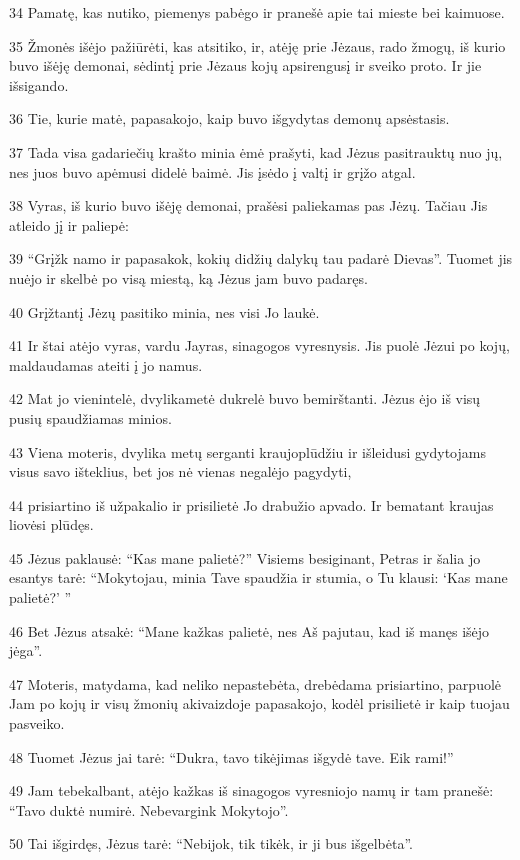 \par 34 Pamatę, kas nutiko, piemenys pabėgo ir pranešė apie tai mieste bei kaimuose. 
\par 35 Žmonės išėjo pažiūrėti, kas atsitiko, ir, atėję prie Jėzaus, rado žmogų, iš kurio buvo išėję demonai, sėdintį prie Jėzaus kojų apsirengusį ir sveiko proto. Ir jie išsigando. 
\par 36 Tie, kurie matė, papasakojo, kaip buvo išgydytas demonų apsėstasis. 
\par 37 Tada visa gadariečių krašto minia ėmė prašyti, kad Jėzus pasitrauktų nuo jų, nes juos buvo apėmusi didelė baimė. Jis įsėdo į valtį ir grįžo atgal. 
\par 38 Vyras, iš kurio buvo išėję demonai, prašėsi paliekamas pas Jėzų. Tačiau Jis atleido jį ir paliepė: 
\par 39 “Grįžk namo ir papasakok, kokių didžių dalykų tau padarė Dievas”. Tuomet jis nuėjo ir skelbė po visą miestą, ką Jėzus jam buvo padaręs. 
\par 40 Grįžtantį Jėzų pasitiko minia, nes visi Jo laukė. 
\par 41 Ir štai atėjo vyras, vardu Jayras, sinagogos vyresnysis. Jis puolė Jėzui po kojų, maldaudamas ateiti į jo namus. 
\par 42 Mat jo vienintelė, dvylikametė dukrelė buvo bemirštanti. Jėzus ėjo iš visų pusių spaudžiamas minios. 
\par 43 Viena moteris, dvylika metų serganti kraujoplūdžiu ir išleidusi gydytojams visus savo išteklius,­ bet jos nė vienas negalėjo pagydyti,­ 
\par 44 prisiartino iš užpakalio ir prisilietė Jo drabužio apvado. Ir bematant kraujas liovėsi plūdęs. 
\par 45 Jėzus paklausė: “Kas mane palietė?” Visiems besiginant, Petras ir šalia jo esantys tarė: “Mokytojau, minia Tave spaudžia ir stumia, o Tu klausi: ‘Kas mane palietė?’ ” 
\par 46 Bet Jėzus atsakė: “Mane kažkas palietė, nes Aš pajutau, kad iš manęs išėjo jėga”. 
\par 47 Moteris, matydama, kad neliko nepastebėta, drebėdama prisiartino, parpuolė Jam po kojų ir visų žmonių akivaizdoje papasakojo, kodėl prisilietė ir kaip tuojau pasveiko. 
\par 48 Tuomet Jėzus jai tarė: “Dukra, tavo tikėjimas išgydė tave. Eik rami!” 
\par 49 Jam tebekalbant, atėjo kažkas iš sinagogos vyresniojo namų ir tam pranešė: “Tavo duktė numirė. Nebevargink Mokytojo”. 
\par 50 Tai išgirdęs, Jėzus tarė: “Nebijok, tik tikėk, ir ji bus išgelbėta”. 
